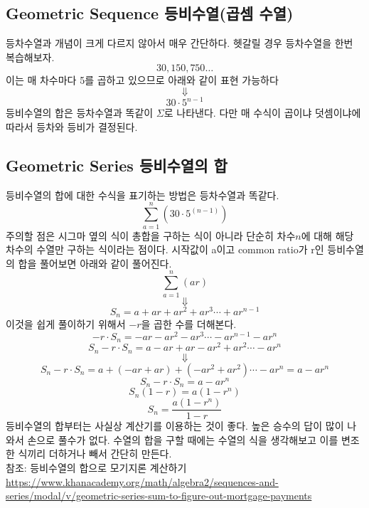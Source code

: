 \documentclass{article}
\begin{document}
\subsection{Geometric Sequence 등비수열(곱셈 수열)}
등차수열과 개념이 크게 다르지 않아서 매우 간단하다. 헷갈릴 경우 등차수열을 한번 복습해보자.
$$30,150,750\dots$$
이는 매 차수마다 5를 곱하고 있으므로 아래와 같이 표현 가능하다
$$\Downarrow$$
$$30\cdot 5^{n-1}$$
등비수열의 합은 등차수열과 똑같이 $\Sigma$로 나타낸다. 다만 매 수식이 곱이냐 덧셈이냐에 따라서 등차와 등비가 결정된다.
\subsection{Geometric Series 등비수열의 합}
등비수열의 합에 대한 수식을 표기하는 방법은 등차수열과 똑같다.
$$ \sum_{a=1}^{n} (30\cdot5^{(n-1)}) $$
주의할 점은 시그마 옆의 식이 총합을 구하는 식이 아니라 단순히 차수$n$에 대해 해당 차수의 수열만 구하는 식이라는 점이다. 시작값이 a이고 common ratio가 r인 등비수열의 합을 풀어보면 아래와 같이 풀어진다.
$$\sum_{a=1}^{n} (ar)$$
$$\Downarrow$$
$$S_{n} = a+ar+ar^{2}+ar^{3}\cdots+ar^{n-1}$$
이것을 쉽게 풀이하기 위해서 $-r$을 곱한 수를 더해본다.
$$-r\cdot S_{n} = -ar-ar^{2}-ar^{3}\cdots-ar^{n-1}-ar^{n}$$
$$S_n-r\cdot S_{n}=a-ar+ar-ar^{2}+ar^{2}\cdots-ar^{n}$$
$$\Downarrow$$
$$S_n-r\cdot S_{n}=a+(-ar+ar)+(-ar^{2}+ar^{2})\cdots-ar^{n}=a-ar^{n}$$
$$S_{n}-r\cdot S_{n}=a-ar^{n}$$
$$S_{n}(1-r)=a(1-r^{n})$$
$$S_{n}=\frac{a(1-r^{n})}{1-r}$$
등비수열의 합부터는 사실상 계산기를 이용하는 것이 좋다. 높은 승수의 답이 많이 나와서 손으로 풀수가 없다.
수열의 합을 구할 때에는 수열의 식을 생각해보고 이를 변조한 식끼리 더하거나 빼서 간단히 만든다.\\
참조: 등비수열의 합으로 모기지론 계산하기
\url{https://www.khanacademy.org/math/algebra2/sequences-and-series/modal/v/geometric-series-sum-to-figure-out-mortgage-payments}
\end{document}
